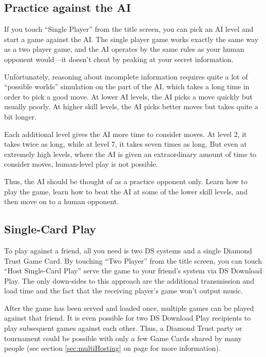 \documentclass[8pt]{extbook}
\begin{document}
\subsection{Practice against the AI}

If you touch ``Single Player'' from the title screen, you can pick an AI level and start a game against the AI.  The single player game works exactly the same way as a two player game, and the AI operates by the same rules as your human opponent would---it doesn't cheat by peaking at your secret information.

Unfortunately, reasoning about incomplete information requires quite a lot of ``possible worlds'' simulation on the part of the AI, which takes a long time in order to pick a good move.  At lower AI levels, the AI picks a move quickly but usually poorly.  At higher skill levels, the AI picks better moves but takes quite a bit longer.

Each additional level gives the AI more time to consider moves.  At level 2, it takes twice as long, while at level 7, it takes seven times as long.  But even at extremely high levels, where the AI is given an extraordinary amount of time to consider moves, human-level play is not possible.

Thus, the AI should be thought of as a practice opponent only.  Learn how to play the game, learn how to beat the AI at some of the lower skill levels, and then move on to a human opponent.  

\subsection{Single-Card Play}
\label{sec:singleCard}
To play against a friend, all you need is two DS systems and a single Diamond Trust Game Card.  By touching ``Two Player'' from the title screen, you can touch ``Host Single-Card Play'' serve the game to your friend's system via DS Download Play.  The only down-sides to this approach are the additional transmission and load time and the fact that the receiving player's game won't output music.

After the game has been served and loaded once, multiple games can be played against that friend.  It is even possible for two DS Download Play recipients to play subsequent games against each other.  Thus, a Diamond Trust party or tournament could be possible with only a few Game Cards shared by many people (see section \ref{sec:multiHosting} on page \pageref{sec:multiHosting} for more information).
 
\end{document}
